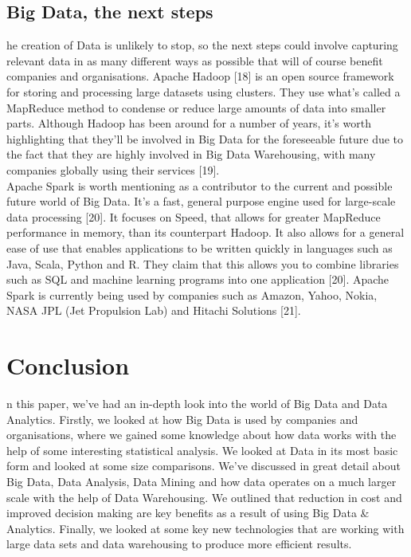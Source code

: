 \documentclass[10pt,journal,compsoc]{IEEEtran}
\begin{document}
\subsection{Big Data, the next steps}
he creation of Data is unlikely to stop, so the next steps could involve capturing relevant data in as many different ways as possible that will of course benefit companies and organisations. Apache Hadoop [18] is an open source framework for storing and processing large datasets using clusters. They use what's called a MapReduce method to condense or reduce large amounts of data into smaller parts. Although Hadoop has been around for a number of years, it's worth highlighting that they'll be involved in Big Data for the foreseeable future due to the fact that they are highly involved in Big Data Warehousing, with many companies globally using their services [19]. \\

Apache Spark is worth mentioning as a contributor to the current and possible future world of Big Data. It's a fast, general purpose engine used for large-scale data processing [20]. It focuses on Speed, that allows for greater MapReduce performance in memory, than its counterpart Hadoop. It also allows for a general ease of use that enables applications to be written quickly in languages such as Java, Scala, Python and R. They claim that this allows you to combine libraries such as SQL and machine learning programs into one application [20]. Apache Spark is currently being used by companies such as Amazon, Yahoo, Nokia, NASA JPL (Jet Propulsion Lab) and Hitachi Solutions [21].



\section{Conclusion}
n this paper, we've had an in-depth look into the world of Big Data and Data Analytics. Firstly, we looked at how Big Data is used by companies and organisations, where we gained some knowledge about how data works with the help of some interesting statistical analysis. We looked at Data in its most basic form and looked at some size comparisons. We've discussed in great detail about Big Data, Data Analysis, Data Mining and how data operates on a much larger scale with the help of Data Warehousing. We outlined that reduction in cost and improved decision making are key benefits as a result of using Big Data \& Analytics. Finally, we looked at some key new technologies that are working with large data sets and data warehousing to produce more efficient results.\\
\end{document}
